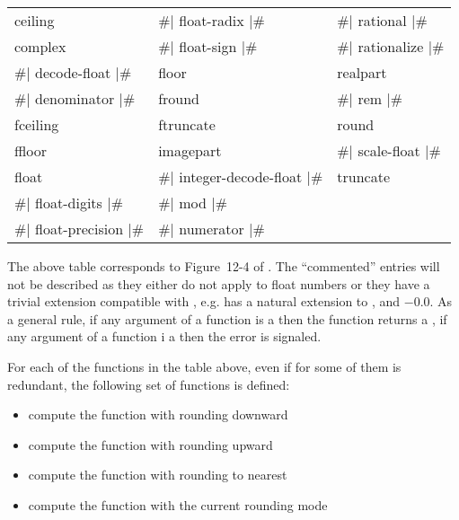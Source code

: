 \documentclass[../../Operations.tex]{subfiles}
\begin{document}
\label{sect:type-manipulation-ops}

\begin{tt}
  \begin{tabular}{lll}
    ceiling & \#| float-radix |\# & \#| rational |\#\\
    complex &  \#| float-sign |\# &  \#| rationalize |\#\\
    \#| decode-float |\# & floor  &  realpart\\
    \#| denominator |\# &  fround &  \#| rem |\#\\
    fceiling & ftruncate &  round\\
    ffloor &  imagepart & \#| scale-float |\#\\
    float & \#| integer-decode-float |\# & truncate\\
    \#| float-digits |\# & \#| mod |\# & \\
    \#| float-precision |\# & \#| numerator |\# & \\
  \end{tabular}
\end{tt}

\vspace*{3mm}

\noindent
The above table corresponds to Figure~12-4 of \cite{1996:ANSIHyperSpec}.
The ``commented'' entries will not be described as they either do not
apply to float numbers or they have a trivial extension
compatible with \cite{2012:LIA1,2001:LIA2,2004:LIA3}, e.g. 
has a natural extension to ,
 and $-0.0$. As a general rule, if any argument of a
function is a  then the function returns a
, if any argument of a function i a
 then the
 error is signaled.

\noindent
For each of the functions in the table above, even if for some of them is
redundant, the following set of functions is defined:
\begin{itemize}
\item {} compute the function with rounding downward
\item {} compute the function with rounding upward
\item {} compute the function with rounding to nearest
\item {} compute the function with the current rounding mode
\end{itemize}
\vspace*{3mm}





\end{document}
